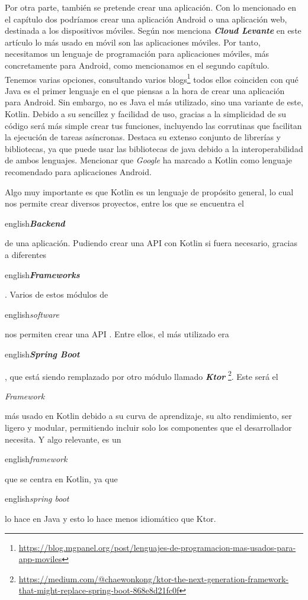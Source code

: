 Por otra parte, también se pretende crear una aplicación. Con lo mencionado en el capítulo dos 
podríamos crear una aplicación Android o una aplicación web, destinada a los 
dispositivos móviles. Según nos menciona \textbf{\textit{Cloud Levante}} en este artículo 
\cite{WebVSApp} lo más usado en móvil son las aplicaciones móviles. Por 
tanto, necesitamos un lenguaje de programación para aplicaciones móviles, más concretamente para 
Android, como mencionamos en el segundo capítulo. Tenemos varias opciones, consultando varios 
blogs\footnote{\url{https://blog.mgpanel.org/post/lenguajes-de-programacion-mas-usados-para-app-moviles}}
todos ellos coinciden con qué Java es el primer lenguaje en el que piensas a la hora de crear 
una aplicación para Android. Sin embargo, no es Java el más utilizado, sino una variante de este, 
Kotlin. Debido a su sencillez y facilidad de uso, gracias a la simplicidad de su código será más simple 
crear tus funciones, incluyendo las corrutinas que facilitan la ejecución de tareas asíncronas. Destaca 
su extenso conjunto de librerías y bibliotecas, ya que puede usar las bibliotecas de java debido a la 
interoperabilidad de ambos lenguajes. Mencionar que \textit{Google} ha marcado a Kotlin como lenguaje 
recomendado para aplicaciones Android.

Algo muy importante es que Kotlin es un lenguaje de propósito general, lo cual nos permite crear 
diversos proyectos, entre los que se encuentra el \begin{otherlanguage}
{english}\textit{\textbf{Backend}}\end{otherlanguage} de una aplicación. Pudiendo crear una API 
 con Kotlin si fuera necesario, gracias a diferentes \begin{otherlanguage}
{english}\textit{\textbf{Frameworks}}\end{otherlanguage} \cite{FrameWrk}. Varios de estos módulos de 
\begin{otherlanguage} {english}\textit{software}\end{otherlanguage} nos permiten crear una API 
. Entre ellos, el más utilizado era \begin{otherlanguage}
{english}\textbf{\textit{Spring Boot}}\end{otherlanguage}, que está siendo remplazado por otro módulo 
llamado \textbf{\textit{Ktor}} \footnote{\url{https://medium.com/@chaewonkong/ktor-the-next-generation-framework-that-might-replace-spring-boot-868e8d21fc0f}}. 
Este será el \begin{otherlanguage}{english}\textit{Framework}\end{otherlanguage} más usado en Kotlin 
debido a su curva de aprendizaje, su alto rendimiento, ser ligero y modular, permitiendo incluir solo 
los componentes que el desarrollador necesita. Y algo relevante, es un \begin{otherlanguage}
{english}\textit{framework}\end{otherlanguage} que se centra en Kotlin, ya que \begin{otherlanguage}
{english}\textit{spring boot}\end{otherlanguage} lo hace en Java y esto lo hace menos idiomático que 
Ktor.

